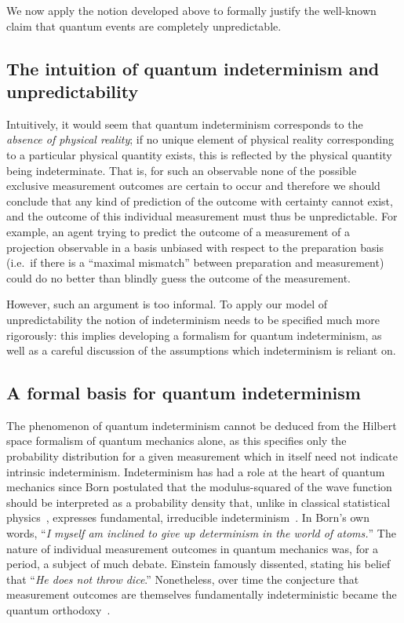 \documentclass[%
 superscriptaddress,
 preprint,
 showpacs,
 showkeys,
 preprintnumbers,
 nofootinbib,
  amsmath,amssymb,
  aps,
 pra,
  longbibliography,
  floatfix,
 ]{revtex4-1}
\theoremstyle{definition}
\begin{document}
We now  apply the notion developed above to formally justify  the well-known claim that quantum events are completely unpredictable.


\subsection{The intuition of quantum indeterminism and unpredictability}

Intuitively, it would seem that quantum indeterminism corresponds to the \emph{absence of physical reality};
if no unique element of physical reality corresponding to a particular physical quantity exists, this is reflected by the physical quantity being indeterminate.
That is, for such an observable none of the possible exclusive measurement outcomes are certain to occur and therefore we should conclude that any kind of prediction of the outcome with certainty cannot exist, and the outcome of this individual measurement must thus be unpredictable.  
For example, an agent trying to predict the outcome of a measurement of a projection observable in a basis unbiased with respect to the preparation basis (i.e.\  if there is a ``maximal mismatch'' between preparation and measurement) could do no better than blindly guess the outcome of the measurement.

However, such an argument is  too informal.  To apply our model of unpredictability 
the notion of indeterminism needs to be specified much more rigorously: this implies developing a formalism for quantum indeterminism, as well as a careful discussion of the assumptions which indeterminism is reliant on.


\subsection{A formal basis for quantum indeterminism}
\label{sec:FQI}

The phenomenon of quantum indeterminism cannot be deduced from the Hilbert space formalism of quantum mechanics alone, as this specifies only the probability distribution for a given measurement which in itself need not indicate intrinsic indeterminism.
Indeterminism has had a role at the heart of quantum mechanics since Born postulated that the modulus-squared of the wave function should be interpreted as a probability density that, unlike in classical statistical physics~\cite{Myrvold2011237}, expresses fundamental,  irreducible indeterminism~\cite{born-26-1}.
In Born's own words, ``\emph{I myself am inclined  to give up determinism in the world of atoms.}''
The nature of individual measurement outcomes in quantum mechanics was, for a period, a subject of much debate.
Einstein famously dissented, stating his belief that \cite[p. 204]{born-69} ``\emph{He does not throw dice}.''
Nonetheless, over time the conjecture that measurement outcomes are themselves fundamentally indeterministic became the quantum orthodoxy~\cite{zeil-05_nature_ofQuantum}.
\end{document}
